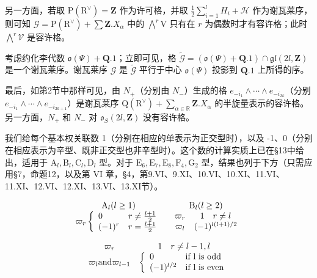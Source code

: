 另一方面，若取 \(\mathrm{P}(\mathrm{R}^{\vee}) = \mathbf{Z}\) 作为许可格，并取 \(\frac{1}{2} \sum_{i=1}^{l} H_i + \mathcal{H}\) 作为谢瓦莱序，则可知 \(\mathcal{G} = \mathrm{P}(\mathrm{R}^{\vee}) + \sum \mathbf{Z}. X_{\alpha}\) 中的 \(\bigwedge^r \mathrm{V}\) 只有在 \(r\) 为偶数时才有容许格；此时 \(\bigwedge^r \mathcal{V}\) 是容许格。

考虑约化李代数 \(\mathfrak{o}(\varPsi) + \mathbf{Q}.1\)；立即可见，格 \(\tilde{\mathcal{G}} = (\mathfrak{o}(\varPsi) + \mathbf{Q}.1) \cap \mathfrak{gl}(2l, \mathbf{Z})\) 是一个谢瓦莱序。谢瓦莱序 \(\mathcal{G}\) 是 \(\tilde{\mathcal{G}}\) 平行于中心 \(\mathfrak{o}(\varPsi)\) 投影到 \(\mathbf{Q}.1\) 上所得的序。

最后，如第2节中那样可见，由 \(N_{+}\)（分别由 \(N_{-}\)）生成的格 \(e_{-i_{1}}\wedge\cdots\wedge e_{-i_{2k}}\)（分别 \(e_{-i_{1}}\wedge\cdots\wedge e_{-i_{2k+1}}\)）是谢瓦莱序 \(\mathrm{Q}(\mathrm{R}^{\vee})+\sum_{\alpha\in\mathbb{R}}\mathbf{Z}.X_{\alpha}\) 的半旋量表示的容许格。另一方面，\(N_{+}\) 和 \(N_{-}\) 对 \(\mathfrak{o}_{S}(2l,\mathbf{Z})\) 没有容许格。


我们给每个基本权关联数 1（分别在相应的单表示为正交型时），以及 -1、0（分别在相应表示为辛型、既非正交型也非辛型时）。这个数的计算实质上已在§13中给出，适用于 \(\mathrm{A}_l, \mathrm{B}_l, \mathrm{C}_l, \mathrm{D}_l\) 型。对于 \(\mathrm{E}_6, \mathrm{E}_7, \mathrm{E}_8, \mathrm{F}_4, \mathrm{G}_2\) 型，结果也列于下方（只需应用§7，命题12，以及第 VI 章，§4，第9.VI、9.XI、10.VI、10.XI、11.VI、11.XI、12.VI、12.XI、13.VI、13.XI节）。

\[
\begin{array}{c c} \mathrm{A} _ {l} (l \geq 1) & \mathrm{B} _ {l} (l \geq 2) \\ \varpi_ {r} \left\{ \begin{array}{l l} 0 & r \neq \frac {l + 1}{2} \\ (- 1) ^ {r} & r = \frac {l + 1}{2} \end{array} \right. & \begin{array}{c c} \varpi_ {r} & 1 \quad r \neq l \\ \varpi_ {l} & (- 1) ^ {l (l + 1) / 2} \end{array} \end{array}
\]

\[
\begin{array}{c c} \varpi_ {r} & 1 \quad r \neq l - 1, l \\ \varpi_ {l} \text {and} \varpi_ {l - 1} & \left\{ \begin{array}{l l} 0 & \text {if l is odd} \\ (- 1) ^ {l / 2} & \text {if l is even} \end{array} \right. \end{array}
\]

